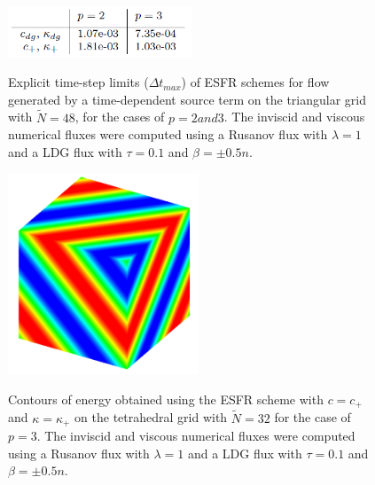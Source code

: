 \begin{figure}
\centering
\includegraphics[height=15mm]{table_922} \\
\caption{Explicit time-step limits ($\Delta t_{max}$) of ESFR schemes for flow generated by a time-dependent source term on the triangular grid with $\tilde{N} = 48$, for the cases of $p = 2 and 3$. The inviscid and viscous numerical fluxes were computed using a Rusanov flux with $\lambda = 1$ and a LDG flux with $\tau = 0.1$ and $\beta = \pm 0.5n$.}
\label{fig:table_922}
\end{figure}

\newpage
\begin{figure}
\centering
\includegraphics[height=60mm]{figure_913} \\
\caption{Contours of energy obtained using the ESFR scheme with $c = c_+$ and $\kappa = \kappa_+$ on the tetrahedral grid with $\tilde{N} = 32$ for the case of $p = 3$. The inviscid and viscous numerical fluxes were computed using a Rusanov flux with $\lambda = 1$ and a LDG flux with $\tau = 0.1$ and $\beta = \pm 0.5n$.}
\label{fig:figure_913}
\end{figure}
